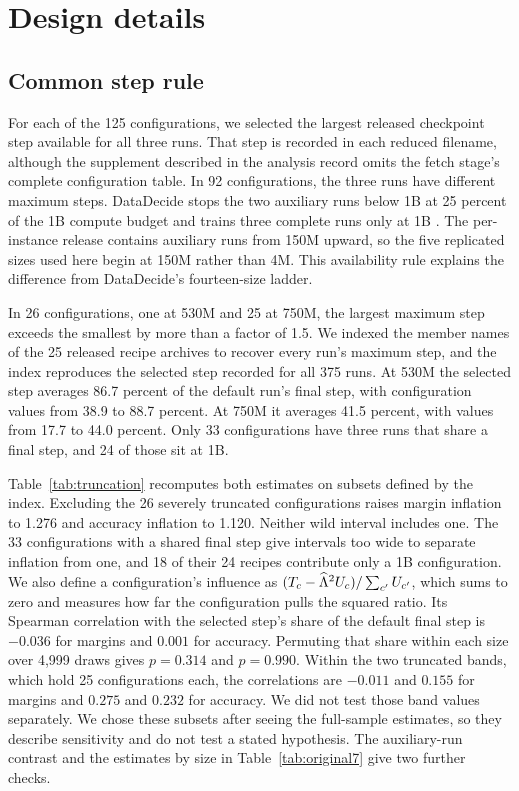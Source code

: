 \section{Design details}
\label{app:design}

\subsection{Common step rule}
\label{app:schedule}
For each of the 125 configurations, we selected the largest released checkpoint step available for all three runs. That step is recorded in each reduced filename, although the supplement described in the analysis record omits the fetch stage's complete configuration table. In 92 configurations, the three runs have different maximum steps. DataDecide stops the two auxiliary runs below 1B at 25 percent of the 1B compute budget and trains three complete runs only at 1B \citep{magnusson2025}. The per-instance release contains auxiliary runs from 150M upward, so the five replicated sizes used here begin at 150M rather than 4M. This availability rule explains the difference from DataDecide's fourteen-size ladder.

In 26 configurations, one at 530M and 25 at 750M, the largest maximum step exceeds the smallest by more than a factor of 1.5. We indexed the member names of the 25 released recipe archives to recover every run's maximum step, and the index reproduces the selected step recorded for all 375 runs. At 530M the selected step averages 86.7 percent of the default run's final step, with configuration values from 38.9 to 88.7 percent. At 750M it averages 41.5 percent, with values from 17.7 to 44.0 percent. Only 33 configurations have three runs that share a final step, and 24 of those sit at 1B.

Table~\ref{tab:truncation} recomputes both estimates on subsets defined by the index. Excluding the 26 severely truncated configurations raises margin inflation to 1.276 and accuracy inflation to 1.120. Neither wild interval includes one. The 33 configurations with a shared final step give intervals too wide to separate inflation from one, and 18 of their 24 recipes contribute only a 1B configuration. We also define a configuration's influence as $(T_c-\widehat{\Lambda}^2U_c)/\sum_{c'}U_{c'}$, which sums to zero and measures how far the configuration pulls the squared ratio. Its Spearman correlation with the selected step's share of the default final step is $-0.036$ for margins and $0.001$ for accuracy. Permuting that share within each size over 4,999 draws gives $p=0.314$ and $p=0.990$. Within the two truncated bands, which hold 25 configurations each, the correlations are $-0.011$ and $0.155$ for margins and $0.275$ and $0.232$ for accuracy. We did not test those band values separately. We chose these subsets after seeing the full-sample estimates, so they describe sensitivity and do not test a stated hypothesis. The auxiliary-run contrast and the estimates by size in Table~\ref{tab:original7} give two further checks.


